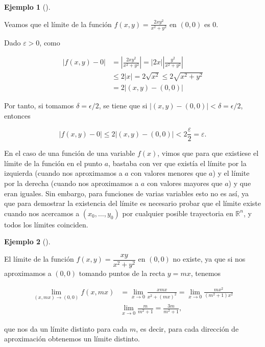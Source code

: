 \documentclass[
  a4paper,
]{scrreport}
\theoremstyle{plain}
\theoremstyle{plain}
\theoremstyle{definition}
\theoremstyle{definition}
\newtheorem{example}{Ejemplo}[chapter]
\theoremstyle{plain}
\theoremstyle{definition}
\theoremstyle{remark}
\begin{document}
\begin{example}[]\protect\hypertarget{exm-limite-funcion-dos-variables}{}\label{exm-limite-funcion-dos-variables}

Veamos que el límite de la función \(f(x,y)=\frac{2xy^2}{x^2+y^2}\) en
\((0,0)\) es \(0\).

Dado \(\varepsilon>0\), como

\begin{align*}
|f(x,y)-0| 
&= \left|\frac{2xy^2}{x^2+y^2}\right| 
= |2x|\left|\frac{y^2}{x^2+y^2}\right| \\
& \leq 2|x| 
= 2\sqrt{x^2}
\leq 2\sqrt{x^2+y^2} \\
&= 2|(x,y)-(0,0)|
\end{align*}

Por tanto, si tomamos \(\delta = \epsilon/2\), se tiene que si
\(|(x,y)-(0,0)|<\delta = \epsilon/2\), entonces

\[
|f(x,y)-0| \leq 2|(x,y)-(0,0)| < 2\frac{\varepsilon}{2} = \varepsilon.
\]

\end{example}

En el caso de una función de una variable \(f(x)\), vimos que para que
existiese el límite de la función en el punto \(a\), bastaba con ver que
existía el límite por la izquierda (cuando nos aproximamos a \(a\) con
valores menores que \(a\)) y el límite por la derecha (cuando nos
aproximamos a \(a\) con valores mayores que \(a\)) y que eran iguales.
Sin embargo, para funciones de varias variables esto no es así, ya que
para demostrar la existencia del límite es necesario probar que el
límite existe cuando nos acercamos a \((x_0,\ldots,y_0)\) por cualquier
posible trayectoria en \(\mathbb{R}^n\), y todos los límites coinciden.

\begin{example}[]\protect\hypertarget{exm-no-existencia-limite}{}\label{exm-no-existencia-limite}

El límite de la función \(f(x,y)=\dfrac{xy}{x^2+y^2}\) en \((0,0)\) no
existe, ya que si nos aproximamos a \((0,0)\) tomando puntos de la recta
\(y=mx\), tenemos

\begin{align*}
\lim_{(x,mx)\to(0,0)} f(x,mx) 
&= \lim_{x\to 0} \frac{xmx}{x^2+(mx)^2} 
= \lim_{x\to 0} \frac{mx^2}{(m^2+1)x^2} \\
& \lim_{x\to 0} \frac{m}{m^2+1} 
= \frac{3m}{m^2+1},
\end{align*}

que nos da un límite distinto para cada \(m\), es decir, para cada
dirección de aproximación obtenemos un límite distinto.

\end{example}
\end{document}
